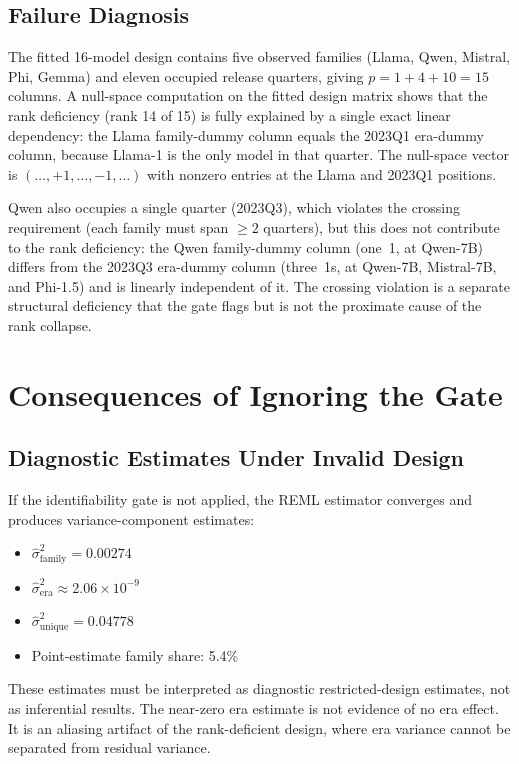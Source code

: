 \documentclass[11pt]{article}
\theoremstyle{definition}
\theoremstyle{plain}
\begin{document}
\subsection{Failure Diagnosis}
The fitted 16-model design contains five observed families (Llama, Qwen, Mistral, Phi, Gemma) and eleven occupied release quarters, giving $p = 1 + 4 + 10 = 15$ columns. A null-space computation on the fitted design matrix shows that the rank deficiency (rank 14 of 15) is fully explained by a single exact linear dependency: the Llama family-dummy column equals the 2023Q1 era-dummy column, because Llama-1 is the only model in that quarter. The null-space vector is $(\ldots, +1, \ldots, -1, \ldots)$ with nonzero entries at the Llama and 2023Q1 positions.

Qwen also occupies a single quarter (2023Q3), which violates the crossing requirement (each family must span $\geq 2$ quarters), but this does not contribute to the rank deficiency: the Qwen family-dummy column (one~1, at Qwen-7B) differs from the 2023Q3 era-dummy column (three~1s, at Qwen-7B, Mistral-7B, and Phi-1.5) and is linearly independent of it. The crossing violation is a separate structural deficiency that the gate flags but is not the proximate cause of the rank collapse.

\section{Consequences of Ignoring the Gate}
\label{sec:consequences}

\subsection{Diagnostic Estimates Under Invalid Design}
If the identifiability gate is not applied, the REML estimator converges and produces variance-component estimates:
\begin{itemize}
\item $\hat{\sigma}^2_{\text{family}} = 0.00274$
\item $\hat{\sigma}^2_{\text{era}} \approx 2.06 \times 10^{-9}$
\item $\hat{\sigma}^2_{\text{unique}} = 0.04778$
\item Point-estimate family share: 5.4\%
\end{itemize}
These estimates must be interpreted as diagnostic restricted-design estimates, not as inferential results. The near-zero era estimate is not evidence of no era effect. It is an aliasing artifact of the rank-deficient design, where era variance cannot be separated from residual variance.
\end{document}

